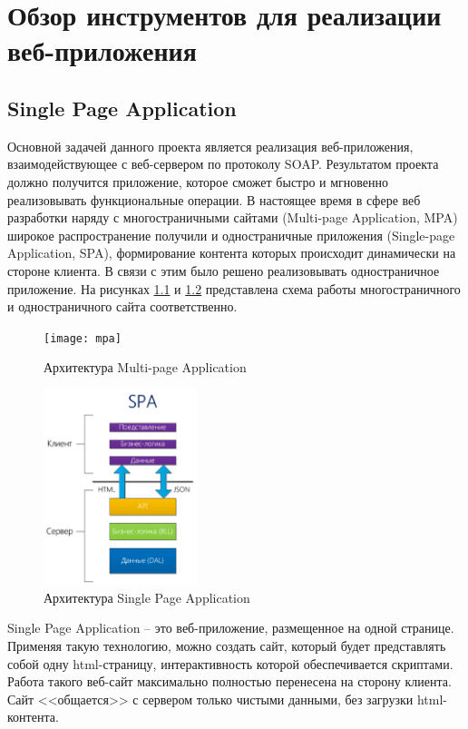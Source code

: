 \chapter{Обзор инструментов для реализации веб-приложения}

\section{Single Page Application}

Основной задачей данного проекта является реализация веб-приложения, взаимодействующее с веб-сервером по протоколу SOAP. Результатом проекта должно получится приложение, которое сможет быстро и мгновенно реализовывать функциональные операции. В настоящее время в сфере веб разработки наряду с многостраничными сайтами (Multi-page Application, MPA) широкое распространение получили и одностраничные приложения (Single-page Application, SPA), формирование контента которых происходит динамически на стороне клиента. В связи с этим было решено реализовывать одностраничное приложение. На рисунках  \ref{mpa} и  \ref{spa} представлена схема работы многостраничного и одностраничного сайта соответственно.

\begin{figure}[ht]
\center\texttt{[image: mpa]}
\caption{Архитектура Multi-page Application}\label{mpa}
\end{figure}

\begin{figure}[ht]
\center\includegraphics[width=0.4\textwidth]{spa}
\caption{Архитектура Single Page Application}\label{spa}
\end{figure}

Single Page Application -- это веб-приложение, размещенное на одной странице. Применяя такую технологию, можно создать сайт,  который будет представлять собой одну html-страницу, интерактивность которой обеспечивается скриптами. Работа такого веб-сайт максимально полностью перенесена на сторону клиента. Сайт <<общается>> с сервером только чистыми данными, без загрузки html-контента.
 
